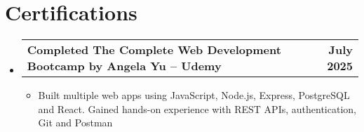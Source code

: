 \documentclass[letterpaper,11pt]{article}
\makeatletter
\newcommand{\resumeItem}[1]{
  \item\small{
    {#1 \vspace{-2pt}}
  }
}
\newcommand{\resumeProjectHeading}[2]{
    \item
    \begin{tabular*}{1.001\textwidth}{l@{\extracolsep{\fill}}r}
      \small#1 & \textbf{\small #2}\\
    \end{tabular*}\vspace{-7pt}
}
\newcommand{\resumeSubHeadingListStart}{\begin{itemize}[leftmargin=0.0in, label={}]}
\newcommand{\resumeSubHeadingListEnd}{\end{itemize}}
\newcommand{\resumeItemListStart}{\begin{itemize}}
\newcommand{\resumeItemListEnd}{\end{itemize}\vspace{-5pt}}
\makeatother
\begin{document}
\section{Certifications}
    \vspace{-5pt}
    \resumeSubHeadingListStart
    \resumeProjectHeading
          {\textbf{Completed The Complete Web Development Bootcamp by Angela Yu – Udemy }}{July 2025}
          \resumeItemListStart
            \resumeItem{Built multiple web apps using JavaScript, Node.js, Express, PostgreSQL and React.
            Gained hands-on experience with REST APIs, authentication, Git and Postman}
          \resumeItemListEnd
          \vspace{-13pt}      
    \resumeSubHeadingListEnd
\vspace{-15pt}
\end{document}
